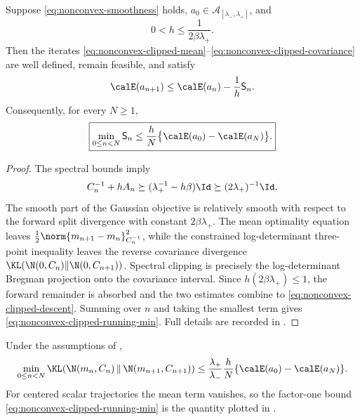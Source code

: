 \begin{theorem}
\label{thm:nonconvex-clipped-stationarity}
Suppose \eqref{eq:nonconvex-smoothness} holds,
\(a_0\in\mathcal A_{[\lambda_-,\lambda_+]}\), and
\[
  0<h\leq\frac1{2\beta\lambda_+}.
\]
Then the iterates
\eqref{eq:nonconvex-clipped-mean}--\eqref{eq:nonconvex-clipped-covariance}
are well defined, remain feasible, and satisfy
\begin{equation}
  \calE(a_{n+1})
  \leq
  \calE(a_n)-\frac1h\mathsf S_n.
  \label{eq:nonconvex-clipped-descent}
\end{equation}
Consequently, for every \(N\geq1\),
\begin{equation}
  \boxed{
  \min_{0\leq n<N}\mathsf S_n
  \leq
  \frac{h}{N}
  \bigl\{\calE(a_0)-\calE(a_N)\bigr\}.}
  \label{eq:nonconvex-clipped-running-min}
\end{equation}
\end{theorem}

\begin{proof}
The spectral bounds imply
\[
  C_n^{-1}+hA_n
  \succeq
  (\lambda_+^{-1}-h\beta)\Id
  \succeq(2\lambda_+)^{-1}\Id.
\]
The smooth part of the Gaussian objective is relatively smooth with respect
to the forward split divergence with constant \(2\beta\lambda_+\).  The
mean optimality equation leaves
\(\frac12\norm{m_{n+1}-m_n}_{C_n^{-1}}^2\), while the constrained
log-determinant three-point inequality leaves the reverse covariance
divergence
\(\KL(\N(0,C_n)\|\N(0,C_{n+1}))\).  Spectral clipping is precisely the
log-determinant Bregman projection onto the covariance interval.  Since
\(h(2\beta\lambda_+)\leq1\), the forward remainder is absorbed and the two
estimates combine to
\eqref{eq:nonconvex-clipped-descent}.  Summing over \(n\) and taking the
smallest term gives \eqref{eq:nonconvex-clipped-running-min}.
Full details are recorded in .
\end{proof}

\begin{corollary}
\label{cor:nonconvex-full-kl}
Under the assumptions of
,
\begin{equation}
  \min_{0\leq n<N}
  \KL\!\left(
    \N(m_n,C_n)\,\middle\|\,\N(m_{n+1},C_{n+1})
  \right)
  \leq
  \frac{\lambda_+}{\lambda_-}
  \frac{h}{N}
  \{\calE(a_0)-\calE(a_N)\}.
  \label{eq:nonconvex-full-kl-bound}
\end{equation}
For centered scalar trajectories the mean term vanishes, so the factor-one
bound \eqref{eq:nonconvex-clipped-running-min} is the quantity plotted in
.
\end{corollary}

